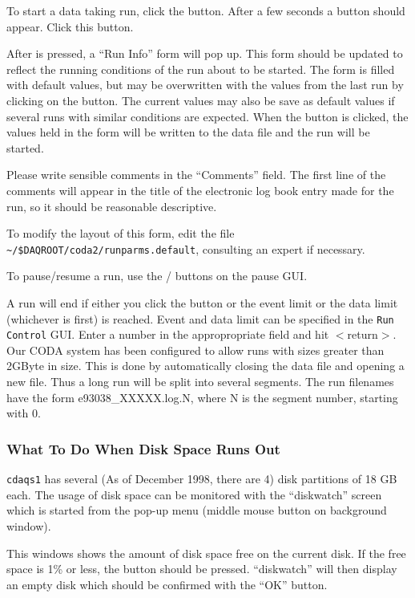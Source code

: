 To start a data taking run, click the {\bf{}} button.  After a few
seconds a {\bf{}} button should appear.  Click this button.

After {\bf{}} is pressed, a ``Run Info'' form will
pop up.  This form should be updated to reflect the running conditions of
the run about to be started.  The form is filled with default values, but
may be overwritten with the values from the last run by clicking on the
{\bf{}} button.  The current values may also be save as default
values if several runs with similar conditions are expected.  When the
{\bf{}} button is clicked, the values held in the form will be written 
to the data file and the run will be started.

Please write sensible comments in the ``Comments'' field.  The first line of 
the
comments will appear in the title of the electronic log book entry made for the
run, so it should be reasonable descriptive.

To modify the layout of this form, edit the file
\verb|~/$DAQROOT/coda2/runparms.default|, consulting an expert if necessary.

To pause/resume a run, use the {\bf{}}/{\bf{}} buttons on
the pause GUI. 

A run will end if either you click the  button or the event
limit or the data limit (whichever is first) is reached. Event and
data limit can be specified in the \verb|Run Control| GUI. Enter a
number in the appropropriate field and hit $<$return$>$.  Our CODA
system has been configured to allow runs with sizes greater than
2GByte in size. This is done by automatically closing the data file
and opening a new file. Thus a long run will be split into several
segments. The run filenames have the form e93038\_XXXXX.log.N, where N
is the segment number, starting with 0.



\subsubsection{What To Do When Disk Space Runs Out}

\label{disk}
\verb|cdaqs1| has several (As of December 1998, there are 4)
disk partitions of 18 GB each.  The usage of
disk space can be monitored with the ``diskwatch'' screen which is started
from the pop-up menu (middle mouse button on background window).

This windows shows the amount of disk space free on the current disk.
If the free space is 1\% or less, the   button should be
pressed.  ``diskwatch'' will then display an empty disk which should be
confirmed with the ``OK'' button.

